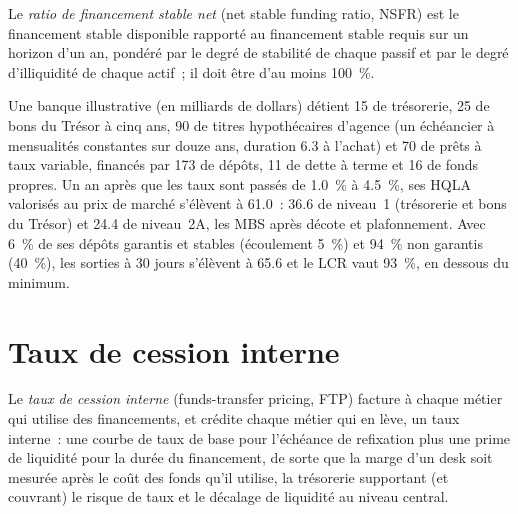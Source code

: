 \begin{definition}\label{def:rc:liquidity-and-funding-risk-bank-treasury:nsfr}
Le \emph{ratio de financement stable net} (net stable funding ratio, NSFR) est le financement stable disponible
rapporté au financement stable requis sur un horizon d'un an, pondéré par le degré de stabilité de chaque passif et
par le degré d'illiquidité de chaque actif~; il doit être d'au moins 100~\%.
\end{definition}

\begin{example}\label{ex:rc:liquidity-and-funding-risk-bank-treasury:bank}
Une banque illustrative (en milliards de dollars) détient 15 de trésorerie, 25 de bons du Trésor à cinq ans, 90 de titres hypothécaires
d'agence (un échéancier à mensualités constantes sur douze ans, duration 6.3 à l'achat) et 70 de prêts à taux variable,
financés par 173 de dépôts, 11 de dette à terme et 16 de fonds propres. Un an après que les taux sont passés de 1.0~\%
à 4.5~\%, ses HQLA valorisés au prix de marché s'élèvent à 61.0~: 36.6 de niveau~1 (trésorerie et bons du Trésor) et 24.4 de niveau~2A,
les MBS après décote et plafonnement. Avec 6~\% de ses dépôts garantis et stables (écoulement 5~\%) et
94~\% non garantis (40~\%), les sorties à 30 jours s'élèvent à 65.6 et le LCR vaut 93~\%, en dessous du minimum.
\end{example}

\label{lst:rc:liquidity-and-funding-risk-bank-treasury:lcr}

\section{Taux de cession interne}

\begin{definition}\label{def:rc:liquidity-and-funding-risk-bank-treasury:ftp}
Le \emph{taux de cession interne} (funds-transfer pricing, FTP) facture à chaque métier qui utilise
des financements, et crédite chaque métier qui en lève, un taux interne~: une courbe de taux de base pour l'échéance de refixation
plus une prime de liquidité pour la durée du financement, de sorte que la marge d'un desk soit mesurée
après le coût des fonds qu'il utilise, la trésorerie supportant (et couvrant) le risque de taux et
le décalage de liquidité au niveau central.
\end{definition}

